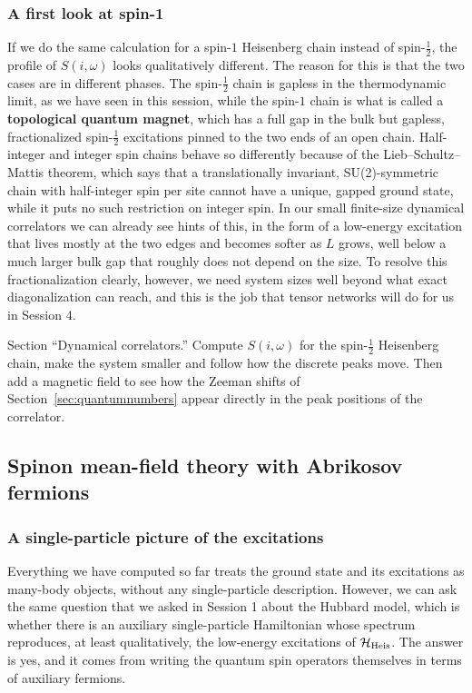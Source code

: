 \documentclass[lecture_notes.tex]{subfiles}
\begin{document}
\subsubsection{A first look at spin-1}
If we do the same calculation for a spin-$1$ Heisenberg chain
instead of spin-$\tfrac12$, the profile of $S(i,\omega)$ looks qualitatively different. The reason
for this is that the two cases are in different phases. The spin-$\tfrac12$ chain is gapless in the
thermodynamic limit, as we have seen in this session, while the spin-$1$ chain is what is called a
\textbf{topological quantum magnet}, which has a full gap in the bulk but gapless, fractionalized
spin-$\tfrac12$ excitations pinned to the two ends of an open chain. Half-integer and integer spin
chains behave so differently because of the Lieb--Schultz--Mattis theorem, which says that a
translationally invariant, SU(2)-symmetric chain with half-integer spin per site cannot have a
unique, gapped ground state, while it puts no such restriction on integer spin. In our small
finite-size dynamical correlators we can already see hints of this, in the form of a low-energy
excitation that lives mostly at the two edges and becomes softer as $L$ grows, well below a much
larger bulk gap that roughly does not depend on the size. To resolve this fractionalization clearly,
however, we need system sizes well beyond what exact diagonalization can reach, and this is the job
that tensor networks will do for us in Session 4.

\begin{notebook}
Section ``Dynamical correlators.'' Compute $S(i,\omega)$ for the spin-$\tfrac12$ Heisenberg chain,
make the system smaller and follow how the discrete peaks move. Then add a magnetic field to see how
the Zeeman shifts of Section~\ref{sec:quantumnumbers} appear directly in the peak positions of the
correlator.
\end{notebook}

\subsection{Spinon mean-field theory with Abrikosov fermions}
\label{sec:spinon}
\subsubsection{A single-particle picture of the excitations}
Everything we have computed so far treats the ground state and its excitations as many-body objects,
without any single-particle description. However, we can ask the same question that we asked in
Session 1 about the Hubbard model, which is whether there is an auxiliary single-particle Hamiltonian
whose spectrum reproduces, at least qualitatively, the low-energy excitations of
$\mathcal{H}_{\mathrm{Heis}}$. The answer is yes, and it comes from writing the quantum spin operators
themselves in terms of auxiliary fermions.
\end{document}
